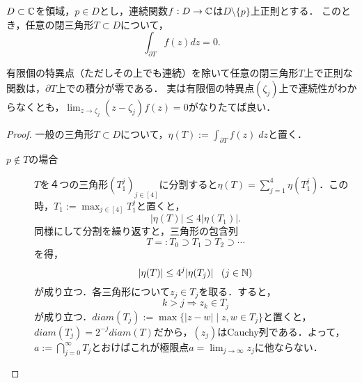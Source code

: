 \documentclass[uplatex, dvipdfmx]{jsreport}
\begin{document}
\begin{lemma}
    $D\subset\mathbb{C}$を領域，$p\in D$とし，連続関数$f:D\to\mathbb{C}$は$D\setminus\{p\}$上正則とする．
    このとき，任意の閉三角形$T\subset D$について，
    \[\int_{\partial T}f(z)dz=0.\]
\end{lemma}
\begin{remarks}
    有限個の特異点（ただしその上でも連続）を除いて任意の閉三角形$T$上で正則な関数は，$\partial T$上での積分が零である．
    実は有限個の特異点$(\zeta_j)$上で連続性がわからなくとも，$\lim_{z\to\zeta_j}(z-\zeta_j)f(z)=0$がなりたてば良い．
\end{remarks}
\begin{proof}
    一般の三角形$T\subset D$について，$\eta(T):=\int_{\partial T}f(z)\;dz$と置く．
    \begin{description}
        \item[$p\notin T$の場合] $T$を４つの三角形$(T_1^j)_{j\in[4]}$に分割すると$\eta(T)=\sum^4_{j=1}\eta(T_1^j)$．この時，$T_1:=\max_{j\in[4]}T_1^j$と置くと，
        \[|\eta(T)|\le 4|\eta(T_1)|.\]
        同様にして分割を繰り返すと，三角形の包含列
        \[ T=:T_0\supset T_1\supset T_2\supset\cdots \]
        を得，
        \[ |\eta(T)|\le 4^{j}|\eta(T_j)|\;\;\;(j\in\mathbb{N}) \]
        が成り立つ．各三角形について$z_j\in T_j$を取る．すると，
        \[ k>j\Rightarrow z_k\in T_j \]
        が成り立つ．$diam(T_j):=\max\{|z-w|\mid z,w\in T_j\}$と置くと，$diam(T_j)=2^{-j}diam(T)$だから，$(z_j)$はCauchy列である．よって，$a:=\bigcap_{j=0}^\infty T_j$とおけばこれが極限点$a=\lim_{j\to\infty}z_j$に他ならない．


\end{description}
\end{proof}
\end{document}
